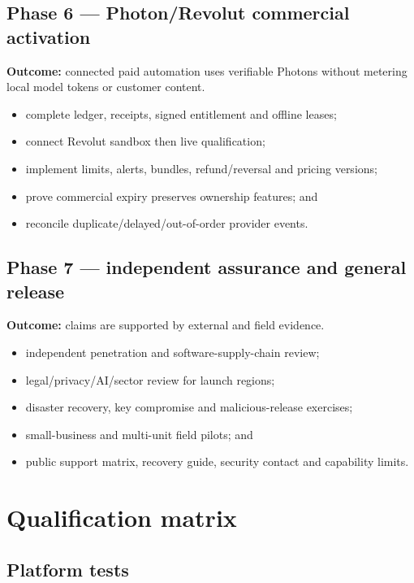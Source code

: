 \documentclass[11pt]{article}
\begin{document}
\subsection{Phase 6 --- Photon/Revolut commercial activation}

\textbf{Outcome:} connected paid automation uses verifiable Photons without metering local model tokens or customer content.

\begin{itemize}
  \item complete ledger, receipts, signed entitlement and offline leases;
  \item connect Revolut sandbox then live qualification;
  \item implement limits, alerts, bundles, refund/reversal and pricing versions;
  \item prove commercial expiry preserves ownership features; and
  \item reconcile duplicate/delayed/out-of-order provider events.
\end{itemize}

\subsection{Phase 7 --- independent assurance and general release}

\textbf{Outcome:} claims are supported by external and field evidence.

\begin{itemize}
  \item independent penetration and software-supply-chain review;
  \item legal/privacy/AI/sector review for launch regions;
  \item disaster recovery, key compromise and malicious-release exercises;
  \item small-business and multi-unit field pilots; and
  \item public support matrix, recovery guide, security contact and capability limits.
\end{itemize}

\section{Qualification matrix}

\subsection{Platform tests}
\end{document}
